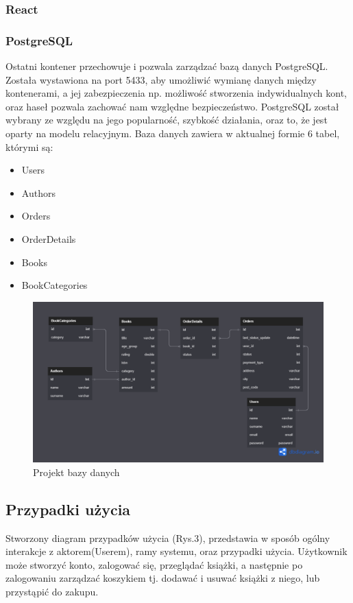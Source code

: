 \documentclass[]{article}
\begin{document}
\subsubsection{React}

\subsubsection{PostgreSQL}

  Ostatni kontener przechowuje i pozwala zarządzać bazą danych PostgreSQL. Została wystawiona na port 5433, aby umożliwić wymianę danych między kontenerami, a jej zabezpieczenia np. możliwość stworzenia indywidualnych kont, oraz haseł pozwala zachować nam względne bezpieczeństwo. PostgreSQL został wybrany ze względu na jego popularność, szybkość działania, oraz to, że jest oparty na modelu relacyjnym.
Baza danych zawiera w aktualnej formie 6 tabel, którymi są:
\begin{itemize}
	\item Users
	\item Authors
	\item Orders
	\item OrderDetails
	\item Books
	\item BookCategories
\end{itemize}
\begin{figure}[h]
	\centering
	\includegraphics[scale=0.35]{../../DbDiagram.png}
	\caption{Projekt bazy danych}
\end{figure}
\newpage

\subsection{Przypadki użycia}
Stworzony diagram przypadków użycia (Rys.3), przedstawia w sposób ogólny interakcje z aktorem(Userem), ramy systemu, oraz przypadki użycia. Użytkownik może stworzyć konto, zalogować się, przeglądać książki, a następnie po zalogowaniu zarządzać koszykiem tj. dodawać i usuwać książki z niego, lub przystąpić do zakupu.
\end{document}
